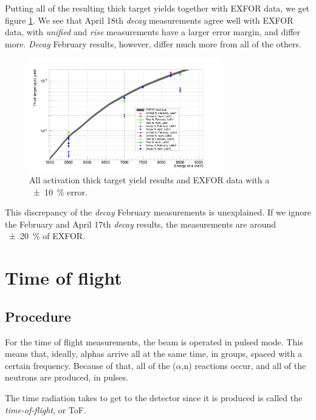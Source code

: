 \documentclass[a4paper,12pt]{report}
\newcommand{\an}{($\alpha$,n) }
\begin{document}
Putting all of the resulting thick target yields together with EXFOR data, we get figure \ref{reactions_v_energy}.
We see that April 18th \textit{decay} measurements agree well with EXFOR data, with \textit{unified} and \textit{rise} measurements have a larger error margin, and differ more.
\textit{Decay} February results, however, differ much more from all of the others.

\begin{figure}[H]
	\centering
	\includegraphics[width=0.75\textwidth]{reactions_v_energy.png}
	\caption{All activation thick target yield results and EXFOR data with a \qty{\pm 10}{\percent} error.}
	\label{reactions_v_energy}
\end{figure}

This discrepancy of the \textit{decay} February measurements is unexplained.
If we ignore the February and April 17th \textit{decay} results, the measurements are around \qty{\pm 20}{\percent} of EXFOR.


\chapter{Time of flight}

\section{Procedure}
For the time of flight measurements, the beam is operated in pulsed mode.
This means that, ideally, alphas arrive all at the same time, in groups, spaced with a certain frequency.	%
Because of that, all of the \an reactions occur, and all of the neutrons are produced, in pulses.

The time radiation takes to get to the detector since it is produced is called the \textit{time-of-flight}, or ToF.
\\
\end{document}

